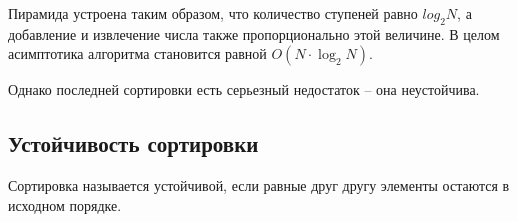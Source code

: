 \documentclass[a4paper, fleqn]{article}
\begin{document}
Пирамида устроена таким образом, что количество ступеней равно $log_2{N}$, а добавление и извлечение числа также пропорционально этой величине. В целом асимптотика алгоритма становится равной $O(N\cdot\log_2{N})$.  

Однако последней сортировки есть серьезный недостаток -- она неустойчива. 

\subsection*{Устойчивость сортировки}

Сортировка называется устойчивой, если равные друг другу элементы остаются в исходном порядке. 
\end{document}
